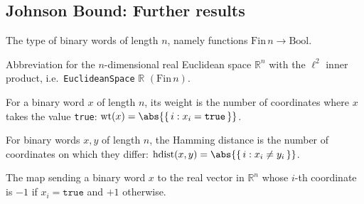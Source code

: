 \subsection*{Johnson Bound: Further results}

\begin{definition}
\label{CodingTheory.Johnson.BitVec}
\leanok
The type of binary words of length $n$, namely functions $\mathrm{Fin}\,n \to \mathrm{Bool}$.
\end{definition}

\begin{definition}
\label{CodingTheory.Johnson.Euc}
\leanok
Abbreviation for the $n$-dimensional real Euclidean space $\mathbb{R}^n$ with the
$\ell^2$ inner product, i.e.\ \texttt{EuclideanSpace} $\mathbb{R}$ $(\mathrm{Fin}\,n)$.
\end{definition}

\begin{definition}
\label{CodingTheory.Johnson.wt}
\leanok
{}
For a binary word $x$ of length $n$, its weight is the number of coordinates where
$x$ takes the value \texttt{true}:
$\mathrm{wt}(x) = \abs{\{\, i : x_i = \texttt{true} \,\}}$.
\end{definition}

\begin{definition}
\label{CodingTheory.Johnson.hdist}
\leanok
{}
For binary words $x,y$ of length $n$, the Hamming distance is the number of
coordinates on which they differ:
$\mathrm{hdist}(x,y) = \abs{\{\, i : x_i \neq y_i \,\}}$.
\end{definition}

\begin{definition}[$\pm 1$ embedding]
\label{CodingTheory.Johnson.pmOne}
\leanok
{}
The map sending a binary word $x$ to the real vector in $\mathbb{R}^n$ whose $i$-th
coordinate is $-1$ if $x_i = \texttt{true}$ and $+1$ otherwise.
\end{definition}

